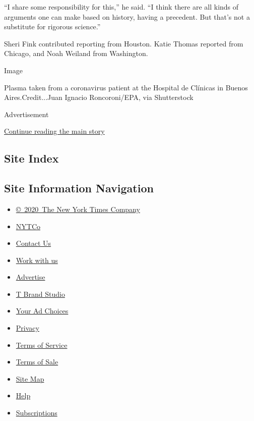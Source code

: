``I share some responsibility for this,'' he said. ``I think there are
all kinds of arguments one can make based on history, having a
precedent. But that's not a substitute for rigorous science.''

Sheri Fink contributed reporting from Houston. Katie Thomas reported
from Chicago, and Noah Weiland from Washington.

Image

Plasma taken from a coronavirus patient at the Hospital de Clínicas in
Buenos Aires.Credit...Juan Ignacio Roncoroni/EPA, via Shutterstock

Advertisement

\protect\hyperlink{after-bottom}{Continue reading the main story}

\hypertarget{site-index}{%
\subsection{Site Index}\label{site-index}}

\hypertarget{site-information-navigation}{%
\subsection{Site Information
Navigation}\label{site-information-navigation}}

\begin{itemize}
\tightlist
\item
  \href{https://help.nytimes3xbfgragh.onion/hc/en-us/articles/115014792127-Copyright-notice}{©~2020~The
  New York Times Company}
\end{itemize}

\begin{itemize}
\tightlist
\item
  \href{https://www.nytco.com/}{NYTCo}
\item
  \href{https://help.nytimes3xbfgragh.onion/hc/en-us/articles/115015385887-Contact-Us}{Contact
  Us}
\item
  \href{https://www.nytco.com/careers/}{Work with us}
\item
  \href{https://nytmediakit.com/}{Advertise}
\item
  \href{http://www.tbrandstudio.com/}{T Brand Studio}
\item
  \href{https://www.nytimes3xbfgragh.onion/privacy/cookie-policy\#how-do-i-manage-trackers}{Your
  Ad Choices}
\item
  \href{https://www.nytimes3xbfgragh.onion/privacy}{Privacy}
\item
  \href{https://help.nytimes3xbfgragh.onion/hc/en-us/articles/115014893428-Terms-of-service}{Terms
  of Service}
\item
  \href{https://help.nytimes3xbfgragh.onion/hc/en-us/articles/115014893968-Terms-of-sale}{Terms
  of Sale}
\item
  \href{https://spiderbites.nytimes3xbfgragh.onion}{Site Map}
\item
  \href{https://help.nytimes3xbfgragh.onion/hc/en-us}{Help}
\item
  \href{https://www.nytimes3xbfgragh.onion/subscription?campaignId=37WXW}{Subscriptions}
\end{itemize}
